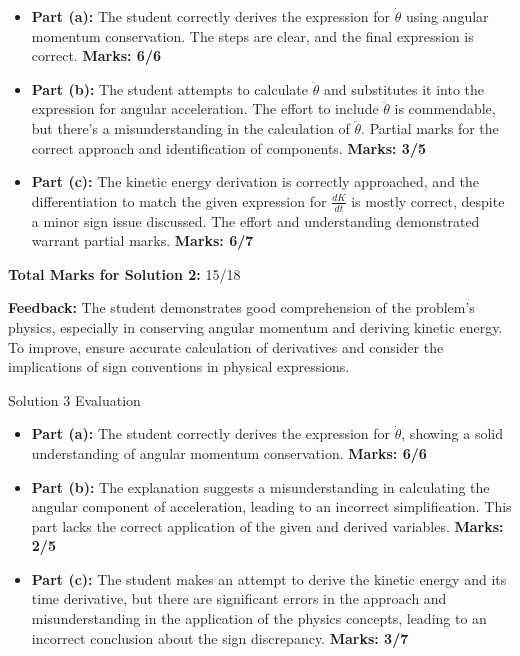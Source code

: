 \documentclass[a4paper,11pt]{article}
\begin{document}
\begin{itemize}
    \item \textbf{Part (a):} The student correctly derives the expression for \(\dot{\theta}\) using angular momentum conservation. The steps are clear, and the final expression is correct. \textbf{Marks: 6/6}
    \item \textbf{Part (b):} The student attempts to calculate \(\ddot{\theta}\) and substitutes it into the expression for angular acceleration. The effort to include \(\ddot{\theta}\) is commendable, but there's a misunderstanding in the calculation of \(\ddot{\theta}\). Partial marks for the correct approach and identification of components. \textbf{Marks: 3/5}
    \item \textbf{Part (c):} The kinetic energy derivation is correctly approached, and the differentiation to match the given expression for \(\frac{dK}{dt}\) is mostly correct, despite a minor sign issue discussed. The effort and understanding demonstrated warrant partial marks. \textbf{Marks: 6/7}
\end{itemize}

\textbf{Total Marks for Solution 2:} 15/18

\textbf{Feedback:} The student demonstrates good comprehension of the problem's physics, especially in conserving angular momentum and deriving kinetic energy. To improve, ensure accurate calculation of derivatives and consider the implications of sign conventions in physical expressions.

Solution 3 Evaluation

\begin{itemize}
    \item \textbf{Part (a):} The student correctly derives the expression for \(\dot{\theta}\), showing a solid understanding of angular momentum conservation. \textbf{Marks: 6/6}
    \item \textbf{Part (b):} The explanation suggests a misunderstanding in calculating the angular component of acceleration, leading to an incorrect simplification. This part lacks the correct application of the given and derived variables. \textbf{Marks: 2/5}
    \item \textbf{Part (c):} The student makes an attempt to derive the kinetic energy and its time derivative, but there are significant errors in the approach and misunderstanding in the application of the physics concepts, leading to an incorrect conclusion about the sign discrepancy. \textbf{Marks: 3/7}
\end{itemize}
\end{document}
